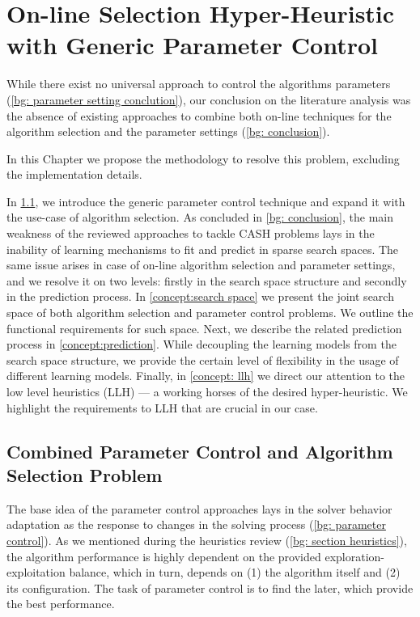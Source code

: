 \chapter{On-line Selection Hyper-Heuristic with Generic Parameter Control}\label{Concept description}
While there exist no universal approach to control the algorithms parameters (\cref{bg: parameter setting conclution}), our conclusion on the literature analysis was the absence of existing approaches to combine both on-line techniques for the algorithm selection and the parameter settings (\cref{bg: conclusion}). 

In this Chapter we propose the methodology to resolve this problem, excluding the implementation details.

In \cref{concept:parameter control}, we introduce the generic parameter control technique and expand it with the use-case of algorithm selection. As concluded in \cref{bg: conclusion}, the main weakness of the reviewed approaches to tackle CASH problems lays in the inability of learning mechanisms to fit and predict in sparse search spaces. The same issue arises in case of on-line algorithm selection and parameter settings, and we resolve it on two levels: firstly in the search space structure and secondly in the prediction process. In \cref{concept:search space} we present the joint search space of both algorithm selection and parameter control problems. We outline the functional requirements for such space. Next, we describe the related prediction process in \cref{concept:prediction}. While decoupling the learning models from the search space structure, we provide the certain level of flexibility in the usage of different learning models.
Finally, in \cref{concept: llh} we direct our attention to the low level heuristics (LLH) — a working horses of the desired hyper-heuristic. We highlight the requirements to LLH that are crucial in our case.


\section{Combined Parameter Control and Algorithm Selection Problem}\label{concept:parameter control}
The base idea of the parameter control approaches lays in the solver behavior adaptation as the response to changes in the solving process (\cref{bg: parameter control}). As we mentioned during the heuristics review (\cref{bg: section heuristics}), the algorithm performance is highly dependent on the provided exploration-exploitation balance, which in turn, depends on (1) the algorithm itself and (2) its configuration. The task of parameter control is to find the later, which provide the best performance.

